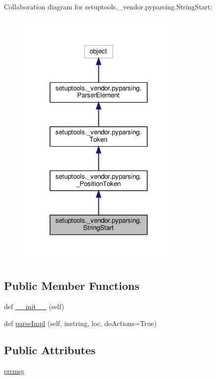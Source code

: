 Collaboration diagram for setuptools.\+\_\+vendor.\+pyparsing.\+String\+Start\+:
\nopagebreak
\begin{figure}[H]
\begin{center}
\leavevmode
\includegraphics[width=227pt]{classsetuptools_1_1__vendor_1_1pyparsing_1_1StringStart__coll__graph}
\end{center}
\end{figure}
\subsection*{Public Member Functions}
\begin{DoxyCompactItemize}
\item 
def \hyperlink{classsetuptools_1_1__vendor_1_1pyparsing_1_1StringStart_aaa2b2ad069096b3fc7730ecce4d7f01c}{\+\_\+\+\_\+init\+\_\+\+\_\+} (self)
\item 
def \hyperlink{classsetuptools_1_1__vendor_1_1pyparsing_1_1StringStart_af632384aa7a59d6eeeb0400f54a04dda}{parse\+Impl} (self, instring, loc, do\+Actions=True)
\end{DoxyCompactItemize}
\subsection*{Public Attributes}
\begin{DoxyCompactItemize}
\item 
\hyperlink{classsetuptools_1_1__vendor_1_1pyparsing_1_1StringStart_aa9d18ab5768e58a127fe5e09def2ce0f}{errmsg}
\end{DoxyCompactItemize}
